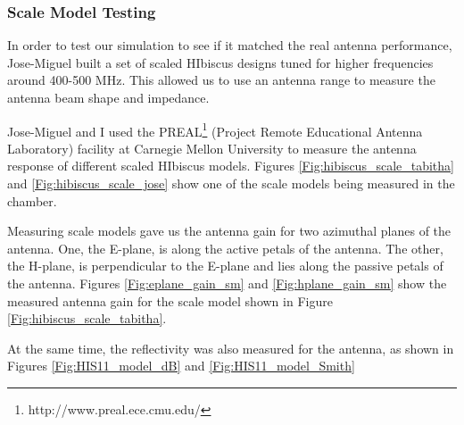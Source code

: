 \subsubsection{Scale Model Testing}
In order to test our simulation to see if it matched the real antenna performance, Jose-Miguel built a set of scaled HIbiscus designs tuned for higher frequencies around 400-500 MHz. This allowed us to use an antenna range to measure the antenna beam shape and impedance. 

Jose-Miguel and I used the PREAL\footnote{http://www.preal.ece.cmu.edu/} (Project Remote Educational Antenna Laboratory) facility at Carnegie Mellon University to measure the antenna response of different scaled HIbiscus models. Figures \ref{Fig:hibiscus_scale_tabitha} and \ref{Fig:hibiscus_scale_jose} show one of the scale models being measured in the chamber.

Measuring scale models gave us the antenna gain for two azimuthal planes of the antenna. One, the E-plane, is along the active petals of the antenna. The other, the H-plane, is perpendicular to the E-plane and lies along the passive petals of the antenna. Figures \ref{Fig:eplane_gain_sm} and \ref{Fig:hplane_gain_sm} show the measured antenna gain for the scale model shown in Figure \ref{Fig:hibiscus_scale_tabitha}. 

At the same time, the reflectivity was also measured for the antenna, as shown in Figures \ref{Fig:HIS11_model_dB} and \ref{Fig:HIS11_model_Smith}

